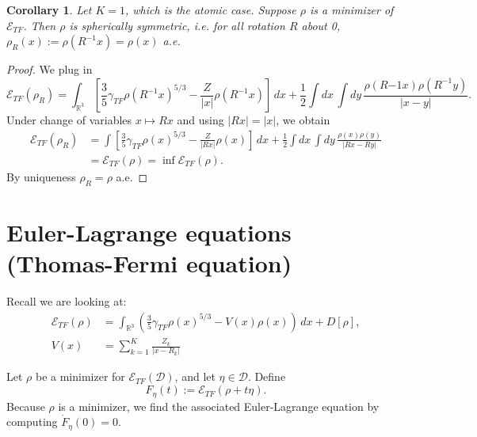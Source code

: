 \documentclass[11pt]{amsart}
\newcommand{\R}{\mathbb{R}}
\newtheorem{cor}{Corollary}
\theoremstyle{definition}
\theoremstyle{definition}
\theoremstyle{definition}
\numberwithin{equation}{section}
\begin{document}
\begin{cor}
Let $K=1$, which is the atomic case. Suppose $\rho$ is a minimizer of $\mathcal{E}_{TF}$. Then $\rho$ is spherically symmetric, i.e. for all rotation $R$ about 0, $\rho_R(x):=\rho(R^{-1}x)=\rho(x)$ a.e.
\end{cor}
\begin{proof}
We plug in
\[
\mathcal{E}_{TF}(\rho_R)=\int_{\R^3}\left[\frac{3}{5}\gamma_{TF}\rho(R^{-1}x)^{5/3}-\frac{Z}{|x|}\rho(R^{-1}x)\right]\,dx+\frac{1}{2}\int dx\,\int dy\,\frac{\rho(R{-1}x)\rho(R^{-1}y)}{|x-y|}.
\]
Under change of variables $x\mapsto Rx$ and using $|Rx|=|x|$, we obtain
\begin{align*}
\mathcal{E}_{TF}(\rho_R)&=\int\left[\frac{3}{5}\gamma_{TF}\rho(x)^{5/3}-\frac{Z}{|Rx|}\rho(x)\right]\,dx+\frac{1}{2}\int dx\,\int dy\,\frac{\rho(x)\rho(y)}{|Rx-Ry|}\\
&=\mathcal{E}_{TF}(\rho)=\inf\mathcal{E}_{TF}(\rho).
\end{align*}
By uniqueness $\rho_R=\rho$ a.e.
\end{proof}

\section{Euler-Lagrange equations (Thomas-Fermi equation)}
Recall we are looking at:
\begin{align*}
\nonumber\mathcal{E}_{TF}(\rho)&=\int_{\R^3}\left(\frac{3}{5}\gamma_{TF}\rho(x)^{5/3}-V(x)\rho(x)\right)\,dx+D[\rho],\\
V(x)&=\sum_{k=1}^K\frac{Z_k}{|x-R_k|}
\end{align*}


Let $\rho$ be a minimizer for $\mathcal{E}_{TF}(\mathcal{D})$, and let $\eta\in\mathcal{D}$. Define
\[
F_\eta(t):=\mathcal{E}_{TF}(\rho+t\eta).
\]
Because $\rho$ is a minimizer, we find the associated Euler-Lagrange equation by computing $\dot{F}_\eta(0)=0$. 
\end{document}
